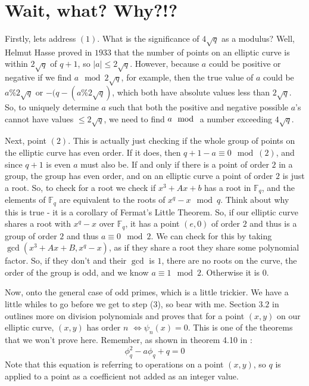 \documentclass[11pt,reqno]{amsart}
\theoremstyle{definition}
\begin{document}
\section{Wait, what? Why?!?}

Firstly, lets address $(1)$. What is the significance of $4 \sqrt q$ as a modulus? Well, Helmut Hasse proved in $1933$ that the number of points on an elliptic curve is within $2\sqrt q$ of $q+1$, so $|a| \leq 2\sqrt{q}$. However, because $a$ could be positive or negative if we find $a \mod 2\sqrt{q}$, for example, then the true value of $a$ could be $a \% 2\sqrt{q}$ or $-(q-(a \% 2\sqrt{q})$, which both have absolute values less than $2 \sqrt{q}$. So, to uniquely determine $a$ such that both the positive and negative possible $a$'s cannot have values $\leq 2\sqrt{q}$, we need to find $a \mod$ a number exceeding $4 \sqrt{q}$.

Next, point $(2)$. This is actually just checking if the whole group of points on the elliptic curve has even order. If it does, then $q+1-a \equiv 0 \mod (2)$, and since $q+1$ is even $a$ must also be. If and only if there is a point of order $2$ in a group, the group has even order, and on an elliptic curve a point of order $2$ is just a root. So, to check for a root we check if $x^3+Ax+b$ has a root in $\mathbb{F}_q$, and the elements of $\mathbb{F}_q$ are equivalent to the roots of $x^q-x \mod q$. Think about why this is true - it is a corollary of Fermat's Little Theorem. So, if our elliptic curve shares a root with $x^q-x$ over $\mathbb{F}_q$, it has a point $(e, 0)$ of order $2$ and thus is a group of order $2$ and thus $a \equiv 0 \mod 2$. We can check for this by taking $\gcd(x^3 + Ax + B, x^q-x)$, as if they share a root they share some polynomial factor. So, if they don't and their $\gcd$ is $1$, there are no roots on the curve, the order of the group is odd, and we know $a\equiv 1 \mod 2$. Otherwise it is $0$. 

Now, onto the general case of odd primes, which is a little trickier. We have a little whiles to go before we get to step (3), so bear with me. Section $3.2$ in \cite{Washington} outlines more on division polynomials and proves that for a point $(x, y)$ on our elliptic curve, $(x, y)$ has order $n$ $\iff \psi_n(x) = 0$. This is one of the theorems that we won't prove here. Remember, as shown in theorem 4.10 in \cite{Washington}: $$\phi_q^2 - a\phi_q + q = 0$$ Note that this equation is referring to operations on a point $(x, y)$, so $q$ is applied to a point as a coefficient not added as an integer value. 
\end{document}
